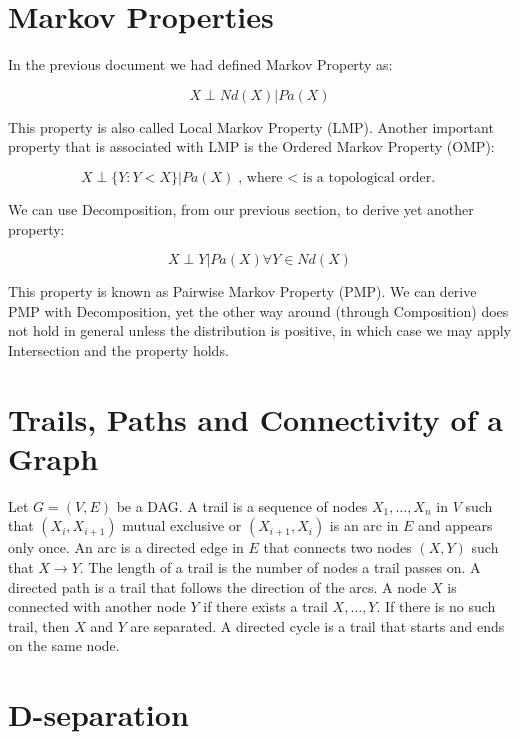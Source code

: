 \documentclass{amsart}
\theoremstyle{plain}
\begin{document}
\section{Markov Properties}

In the previous document we had defined Markov Property as:

\begin{equation*}
  X\perp Nd(X) | Pa(X)
\end{equation*}

This property is also called Local Markov Property (LMP). Another important property that is
associated with LMP is the Ordered Markov Property (OMP):

\begin{equation*}
  X\perp \{Y:Y<X\} | Pa(X)\text{, where $<$ is a topological order.}
\end{equation*}

We can use Decomposition, from our previous section, to derive yet another property:

\begin{equation*}
  X\perp Y | Pa(X) \forall Y \in Nd(X)
\end{equation*}

This property is known as Pairwise Markov Property (PMP). We can derive PMP with Decomposition,
yet the other way around (through Composition) does not hold in general unless the distribution is
positive, in which case we may apply Intersection and the property holds.

\section{Trails, Paths and Connectivity of a Graph}

Let $G=(V,E)$ be a DAG\@. A trail is a sequence of nodes $X_1,\ldots,X_n$ in $V$ such that $(X_i,
X_{i+1})$ mutual exclusive or $(X_{i+1},X_i)$ is an arc in $E$ and appears only once. An arc is a
directed edge in $E$ that connects two nodes $(X,Y)$ such that $X\rightarrow Y$. The length of a
trail is the number of nodes a trail passes on. A directed path is a trail that follows the
direction of the arcs. A node $X$ is connected with another node $Y$ if there exists a trail
$X,\ldots,Y$. If there is no such trail, then $X$ and $Y$ are separated. A directed cycle is a
trail that starts and ends on the same node.

\section{D-separation}
\end{document}
